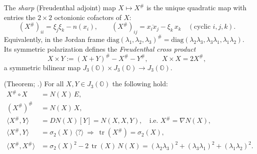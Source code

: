 \begin{definition}\label{def:app-albert:sharp}
The \emph{sharp} (Freudenthal adjoint) map $X\mapsto X^\#$ is the unique quadratic
map with entries the $2\times2$ octonionic cofactors of $X$:
\begin{equation}\label{eq:app-albert:sharpentries}
  (X^\#)_{ii}=\xi_j\xi_k-n(x_i),
  \qquad
  (X^\#)_{ij}=\overline{x_i x_j}-\xi_k\,x_k
  \quad(\text{cyclic } i,j,k).
\end{equation}
Equivalently, in the Jordan frame
$\mathrm{diag}(\lambda_1,\lambda_2,\lambda_3)^\#
 =\mathrm{diag}(\lambda_2\lambda_3,\lambda_3\lambda_1,\lambda_1\lambda_2)$. Its
symmetric polarization defines the \emph{Freudenthal cross product}
\begin{equation}\label{eq:app-albert:cross}
  X\times Y:=(X+Y)^\#-X^\#-Y^\#,
  \qquad X\times X=2X^\#,
\end{equation}
a symmetric bilinear map $J_3(\mathbb O)\times J_3(\mathbb O)\to J_3(\mathbb O)$.
\end{definition}

\begin{theorem}\label{thm:app-albert:freudenthal}
\textup{(Theorem; \cite{Freudenthal:1985,McCrimmon:2004,Springer:2000}.)}
For all $X,Y\in J_3(\mathbb O)$ the following hold:
\begin{align}
  X^\#\circ X &= N(X)\,E,
  \label{eq:app-albert:F1}\\
  (X^\#)^\# &= N(X)\,X,
  \label{eq:app-albert:F2}\\
  \langle X^\#,Y\rangle &= DN(X)[Y]
     = N(X,X,Y),
  \quad\text{i.e. } X^\#=\nabla N(X),
  \label{eq:app-albert:F3}\\
  \langle X^\#,Y\rangle &= \sigma_2(X)\,\langle?\rangle
     \ \Longrightarrow\
  \operatorname{tr}(X^\#)=\sigma_2(X),
  \label{eq:app-albert:F4}\\
  \langle X^\#,X^\#\rangle
     &= \sigma_2(X)^2-2\,\operatorname{tr}(X)\,N(X)
     = (\lambda_2\lambda_3)^2+(\lambda_3\lambda_1)^2+(\lambda_1\lambda_2)^2.
  \label{eq:app-albert:F5}
\end{align}
\end{theorem}

